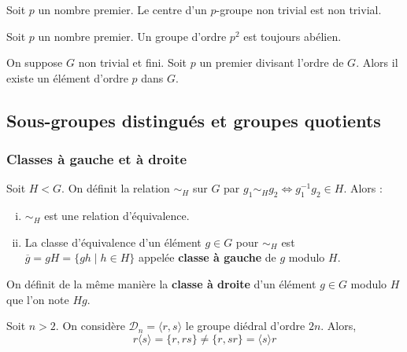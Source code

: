 	\begin{corollary}
		Soit $p$ un nombre premier. Le centre d'un $p$-groupe non trivial est non trivial.
	\end{corollary}

	\begin{corollary}
		Soit $p$ un nombre premier. Un groupe d'ordre $p^2$ est toujours abélien.
	\end{corollary}

	\begin{application}
		On suppose $G$ non trivial et fini. Soit $p$ un premier divisant l'ordre de $G$. Alors il existe un élément d'ordre $p$ dans $G$.
	\end{application}

	\subsection{Sous-groupes distingués et groupes quotients}

	\subsubsection{Classes à gauche et à droite}


	\begin{proposition}
		\label{103-1}
		Soit $H < G$. On définit la relation $\sim_H$ sur $G$ par $g_1 \sim_H g_2 \iff g_1^{-1} g_2 \in H$. Alors :
		\begin{enumerate}[(i)]
			\item $\sim_H$ est une relation d'équivalence.
			\item La classe d'équivalence d'un élément $g \in G$ pour $\sim_H$ est $\overline{g} = gH = \{ gh \mid h \in H \}$ appelée \textbf{classe à gauche} de $g$ modulo $H$.
		\end{enumerate}
	\end{proposition}

	\begin{remark}
		On définit de la même manière la \textbf{classe à droite} d'un élément $g \in G$ modulo $H$ que l'on note $Hg$.
	\end{remark}

	\begin{example}
		Soit $n > 2$. On considère $\mathcal{D}_n = \langle r, s \rangle$ le groupe diédral d'ordre $2n$. Alors,
		\[ r \langle s \rangle = \{ r, rs \} \neq \{ r, sr \} = \langle s \rangle r \]
	\end{example}

